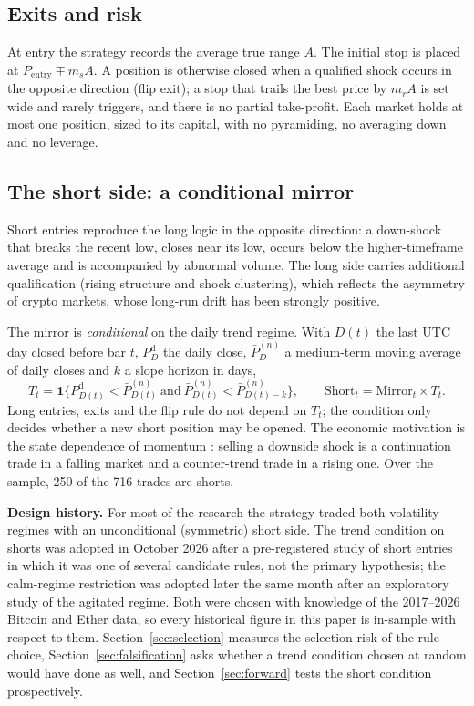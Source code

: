 \documentclass[11pt,a4paper]{article}
\newcommand{\1}{\mathbf{1}}
\begin{document}
\subsection{Exits and risk}

At entry the strategy records the average true range $A$. The initial stop is placed at $P_{\text{entry}}\mp m_s A$. A position is otherwise closed when a qualified shock occurs in the opposite direction (flip exit); a stop that trails the best price by $m_r A$ is set wide and rarely triggers, and there is no partial take-profit. Each market holds at most one position, sized to its capital, with no pyramiding, no averaging down and no leverage.

\subsection{The short side: a conditional mirror}\label{sec:mirror}

Short entries reproduce the long logic in the opposite direction: a down-shock that breaks the recent low, closes near its low, occurs below the higher-timeframe average and is accompanied by abnormal volume. The long side carries additional qualification (rising structure and shock clustering), which reflects the asymmetry of crypto markets, whose long-run drift has been strongly positive.

The mirror is \emph{conditional} on the daily trend regime. With $D(t)$ the last UTC day closed before bar $t$, $P^{\mathrm{d}}_D$ the daily close, $\bar P^{(n)}_D$ a medium-term moving average of daily closes and $k$ a slope horizon in days,
\begin{equation}
T_t=\1\Big\{P^{\mathrm{d}}_{D(t)}<\bar P^{(n)}_{D(t)}\ \text{and}\ \bar P^{(n)}_{D(t)}<\bar P^{(n)}_{D(t)-k}\Big\},
\qquad
\text{Short}_t=\text{Mirror}_t\times T_t .
\end{equation}
Long entries, exits and the flip rule do not depend on $T_t$; the condition only decides whether a new short position may be opened. The economic motivation is the state dependence of momentum \citep{DanielMoskowitz2016}: selling a downside shock is a continuation trade in a falling market and a counter-trend trade in a rising one. Over the sample, 250 of the 716 trades are shorts.

\textbf{Design history.} For most of the research the strategy traded both volatility regimes with an unconditional (symmetric) short side. The trend condition on shorts was adopted in October 2026 after a pre-registered study of short entries in which it was one of several candidate rules, not the primary hypothesis; the calm-regime restriction was adopted later the same month after an exploratory study of the agitated regime. Both were chosen with knowledge of the 2017--2026 Bitcoin and Ether data, so every historical figure in this paper is in-sample with respect to them. Section~\ref{sec:selection} measures the selection risk of the rule choice, Section~\ref{sec:falsification} asks whether a trend condition chosen at random would have done as well, and Section~\ref{sec:forward} tests the short condition prospectively.
\end{document}
